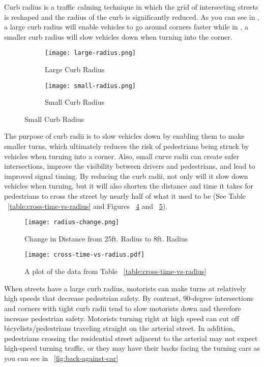 Curb radius is a traffic calming technique in which the grid of intersecting streets is reshaped and the radius of the curb is significantly reduced. As you can see in , a large curb radius will enable vehicles to go around corners faster while in , a smaller curb radius will slow vehicles down when turning into the corner.

\begin{figure}[h]
\centering
\begin{subfigure}[b]{0.4\textwidth}
	\texttt{[image: large-radius.png]}
	\caption{Large Curb Radius}\label{fig:large-radius}
\end{subfigure}
\begin{subfigure}[b]{0.4\textwidth}
	\texttt{[image: small-radius.png]}
	\caption{Small Curb Radius}\label{fig:small-radius}
\end{subfigure}
\end{figure}

        The purpose of curb radii is to slow vehicles down by enabling them to make smaller turns, which ultimately reduces the risk of pedestrians being struck by vehicles when turning into a corner. Also, small curve radii can create safer intersections, improve the visibility between drivers and pedestrians, and lead to improved signal timing. By reducing the curb radii, not only will it slow down vehicles when turning, but it will also shorten the distance and time it takes for pedestrians to cross the street by nearly half of what it used to be (See Table ~\ref{table:cross-time-vs-radius} and Figures ~\ref{fig:radius-change} and ~\ref{fig:cross-time-vs-radius}).
        
\begin{figure}[h]
\centering
	\texttt{[image: radius-change.png]}
	\caption[Effect of changing curb radius]{Change in Distance from 25ft. Radius to 8ft. Radius}\label{fig:radius-change}
\end{figure}



\begin{figure}[h]
\centering
	\texttt{[image: cross-time-vs-radius.pdf]}
	\caption[Plot of crossing times against curve radii]{A plot of the data from Table ~\ref{table:cross-time-vs-radius}}\label{fig:cross-time-vs-radius}
\end{figure}

        When streets have a large curb radius, motorists can make turns at relatively high speeds that decrease pedestrian safety. By contrast, 90-degree intersections and corners with tight curb radii tend to slow motorists down and therefore increase pedestrian safety. Motorists turning right at high speed can cut off bicyclists/pedestrians traveling straight on the arterial street. In addition, pedestrians crossing the residential street adjacent to the arterial may not expect high-speed turning traffic, or they may have their backs facing the turning cars as you can see in ~\ref{fig:back-against-car}

